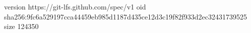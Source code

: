 version https://git-lfs.github.com/spec/v1
oid sha256:9fc6a529197cca44459eb985d1187d435ce12d3c19f82f933d2ec32431739525
size 124350
